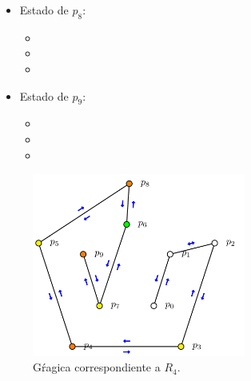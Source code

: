 \begin{multicols}{2}
\begin{itemize}
\begin{itemize}
      \item {}
      \end{itemize}

\item Estado de $p_8$:
      \begin{itemize}
      \item {}
      
      \item {}
      
      \item {}
      \end{itemize}

\item Estado de $p_9$:
      \begin{itemize}
      \item {}
      
      \item {}
      
      \item {}
      \end{itemize}

\end{itemize}
\end{multicols} 
\newpage

\begin{figure}[ht]
        \begin{center}
                \includegraphics[width=7cm]{RD4.png}
                \caption{Gŕagica correspondiente a $R_4$.}
        \end{center}
\end{figure}

